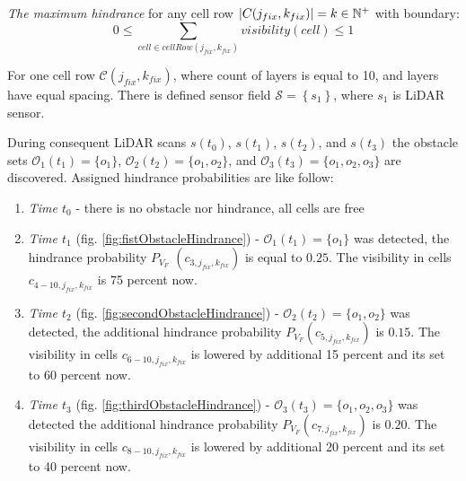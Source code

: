 \noindent \emph{The maximum hindrance} for any cell row $|{C}(j_{fix},k_{fix})|=k\in \mathbb{N}^+$ with  boundary:
\begin{equation}
    0 \le \sum_{cell\in cell Row(j_{fix},k_{fix})} visibility(cell) \le 1
\end{equation}

\noindent For one cell row $\mathscr{C}(j_{fix},k_{fix})$, where count of layers is equal to 10, and layers have equal spacing. There is defined sensor field $\mathscr{S}=\left\{s_1\right\}$, where $s_1$ is LiDAR sensor. 

During consequent LiDAR scans $s(t_0)$, $s(t_1)$, $s(t_2)$, and $s(t_3)$ the obstacle sets $\mathscr{O}_1(t_1)=\{o_1\}$, $\mathscr{O}_2(t_2)=\{o_1,o_2\}$, and $\mathscr{O}_3(t_3)=\{o_1,o_2,o_3\}$ are discovered. Assigned hindrance probabilities are like follow:
\begin{enumerate}
    
    \item\emph{Time $t_0$} - there is no obstacle nor hindrance, all cells are free
    \item\emph{Time $t_1$} (fig. \ref{fig:fistObstacleHindrance}) - $\mathscr{O}_1(t_1)=\{o_1\}$ was detected, the hindrance probability $P_{V_F}$ $(c_{3,j_{fix},k_{fix}})$ is equal to $0.25$. The visibility in cells $c_{4-10,j_{fix},k_{fix}}$ is 75 percent now. 
    
    \item\emph{Time $t_2$} (fig. \ref{fig:secondObstacleHindrance}) - $\mathscr{O}_2(t_2)=\{o_1,o_2\}$ was detected, the additional hindrance probability  $P_{V_F}(c_{5,j_{fix},k_{fix}})$ is $0.15$. The visibility in cells $c_{6-10,j_{fix},k_{fix}}$ is lowered by additional 15 percent and its set to 60 percent now.
    
    \item\emph{Time $t_3$} (fig. \ref{fig:thirdObstacleHindrance}) - $\mathscr{O}_3(t_3)=\{o_1,o_2,o_3\}$  was detected the additional hindrance probability  $P_{V_F}(c_{7,j_{fix},k_{fix}})$ is $0.20$. The visibility in cells $c_{8-10,j_{fix},k_{fix}}$ is lowered by additional 20 percent and its set to 40 percent now.
\end{enumerate}

